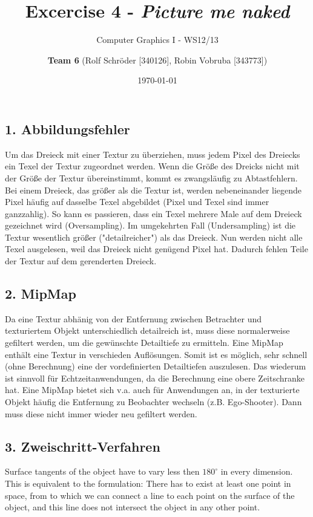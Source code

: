 \documentclass[a4paper,headings=small]{scrartcl}
\title{Excercise 4 - \emph{Picture me naked}}
\subtitle{Computer Graphics I - WS12/13}
\author{\textbf{Team 6} (Rolf Schröder [340126], Robin Vobruba [343773])}
\date{\today}
\numberwithin{equation}{section} %
\numberwithin{figure}{section}   %
\begin{document}
\maketitle

\subsection*{1. Abbildungsfehler}
Um das Dreieck mit einer Textur zu überziehen, muss jedem Pixel des Dreiecks ein Texel der Textur zugeordnet werden.
Wenn die Größe des Dreicks nicht mit der Größe der Textur übereinstimmt, kommt es zwangsläufig zu Abtastfehlern.
Bei einem Dreieck, das größer als die Textur ist, werden nebeneinander liegende Pixel häufig auf dasselbe Texel abgebildet (Pixel und Texel sind immer ganzzahlig).
So kann es passieren, dass ein Texel mehrere Male auf dem Dreieck gezeichnet wird (Oversampling).
Im umgekehrten Fall (Undersampling) ist die Textur wesentlich größer ("detailreicher") als das Dreieck.
Nun werden nicht alle Texel ausgelesen, weil das Dreieck nicht genügend Pixel hat.
Dadurch fehlen Teile der Textur auf dem gerenderten Dreieck.

\subsection*{2. MipMap}
Da eine Textur abhänig von der Entfernung zwischen Betrachter und texturiertem Objekt unterschiedlich detailreich ist, muss diese normalerweise gefiltert werden, um die gewünschte Detailtiefe zu ermitteln.
Eine MipMap enthält eine Textur in verschieden Auflösungen.
Somit ist es möglich, sehr schnell (ohne Berechnung) eine der vordefinierten Detailtiefen auszulesen.
Das wiederum ist sinnvoll für Echtzeitanwendungen, da die Berechnung eine obere Zeitschranke hat.
Eine MipMap bietet sich v.a. auch für Anwendungen an, in der texturierte Objekt häufig die Entfernung zu Beobachter wechseln (z.B. Ego-Shooter).
Dann muss diese nicht immer wieder neu gefiltert werden.

\subsection*{3. Zweischritt-Verfahren}
Surface tangents of the object have to vary less then $180^{\circ}$ in every dimension.
This is equivalent to the formulation:
There has to exist at least one point in space,
from to which we can connect a line to each point on the surface of the object,
and this line does not intersect the object in any other point.
\end{document}
